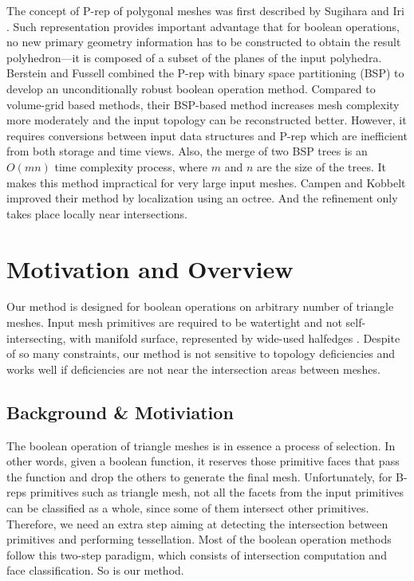 \documentclass[10pt,journal,compsoc]{IEEEtran}
\begin{document}
The concept of P-rep of polygonal meshes was first described by Sugihara and Iri \cite{sugihara1990solid}. Such representation provides important advantage that for boolean operations, no new primary geometry information has to be constructed to obtain the result polyhedron---it is composed of a subset of the planes of the input polyhedra. Berstein and Fussell \cite{bernstein2009fast} combined the P-rep with binary space partitioning (BSP) \cite{thibault1987set,naylor1990merging} to develop an unconditionally robust boolean operation method. Compared to volume-grid based methods, their BSP-based method increases mesh complexity more moderately and the input topology can be reconstructed better. However, it requires conversions between input data structures and P-rep which are inefficient from both storage and time views. Also, the merge of two BSP trees is an $O(mn)$ time complexity process, where $m$ and $n$ are the size of the trees. It makes this method impractical for very large input meshes. Campen and Kobbelt \cite{campen2010exact} improved their method by localization using an octree. And the refinement only takes place locally near intersections.


\section{Motivation and Overview}

\label{sec:overview}
Our method is designed for boolean operations on arbitrary number of triangle meshes. Input mesh primitives are required to be watertight and not self-intersecting, with manifold surface, represented by wide-used halfedges \cite{mcguire2000half}. Despite of so many constraints, our method is not sensitive to topology deficiencies and works well if deficiencies are not near the intersection areas between meshes.


\subsection{Background \& Motiviation}
\label{sec:paradigm}

The boolean operation of triangle meshes is in essence a process of selection. In other words, given a boolean function, it reserves those primitive faces that pass the function and drop the others to generate the final mesh. Unfortunately, for B-reps primitives such as triangle mesh, not all the facets from the input primitives can be classified as a whole, since some of them intersect other primitives. Therefore, we need an extra step aiming at detecting the intersection between primitives and performing tessellation. Most of the boolean operation methods follow this two-step paradigm, which consists of intersection computation and face classification. So is our method.
\end{document}
